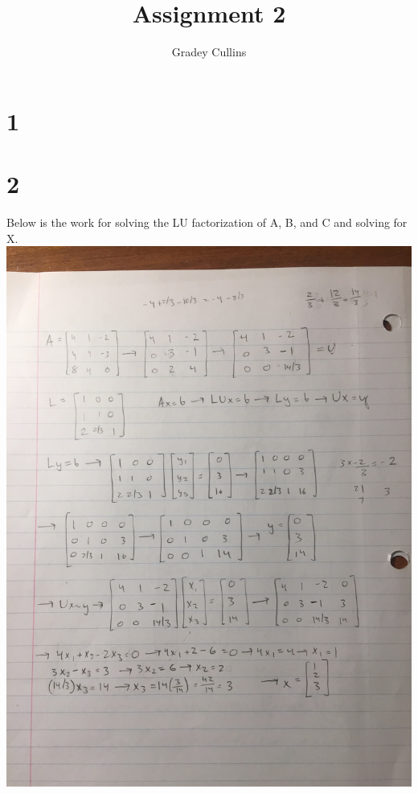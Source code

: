 \documentclass[10pt,a4paper]{article}
\author{Gradey Cullins}
\title{Assignment 2}
\begin{document}
\maketitle

\section*{1}
\section*{2}

Below is the work for solving the LU factorization of A, B, and C and solving for X.\\

\includegraphics[scale=0.10]{LU_1.JPG} \\
\end{document}
